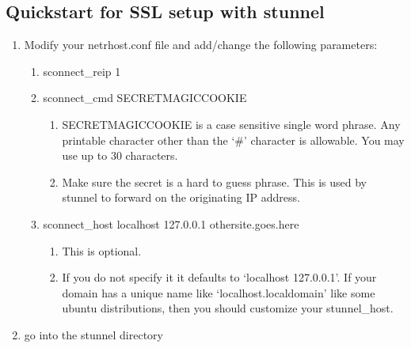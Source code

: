 \documentclass[letterpaper,10pt,english]{sphinxmanual}
\begin{document}
\subsection{Quickstart for SSL setup with stunnel}
\label{\detokenize{security:quickstart-for-ssl-setup-with-stunnel}}\begin{enumerate}
%
\item {} 
\sphinxAtStartPar
Modify your netrhost.conf file and add/change the following parameters:
\begin{enumerate}
%
\item {} 
\sphinxAtStartPar
sconnect\_reip 1

\item {} 
\sphinxAtStartPar
sconnect\_cmd SECRET\sphinxhyphen{}MAGIC\sphinxhyphen{}COOKIE
\begin{enumerate}
%
\item {} 
\sphinxAtStartPar
SECRET\sphinxhyphen{}MAGIC\sphinxhyphen{}COOKIE is a case sensitive single word phrase. Any printable character other than the ‘\#’ character is allowable.  You may use up to 30 characters.

\item {} 
\sphinxAtStartPar
Make sure the secret is a hard to guess phrase.  This is used by stunnel to forward on the originating IP address.

\end{enumerate}

\item {} 
\sphinxAtStartPar
sconnect\_host localhost 127.0.0.1 othersite.goes.here
\begin{enumerate}
%
\item {} 
\sphinxAtStartPar
This is optional.

\item {} 
\sphinxAtStartPar
If you do not specify it it defaults to ‘localhost 127.0.0.1’.  If your domain has a unique name like ‘localhost.localdomain’ like some ubuntu distributions, then you should customize your stunnel\_host.

\end{enumerate}

\end{enumerate}

\item {} 
\sphinxAtStartPar
go into the stunnel directory


\end{enumerate}
\end{document}
